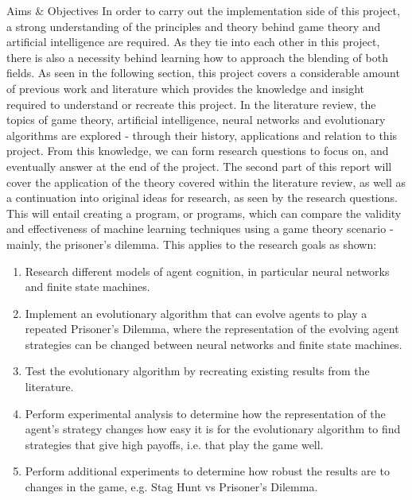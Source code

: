 \documentclass[12pt,a4paper]{article}
\makeatletter
\renewcommand\subsection{\@startsection {subsection}{1}{2mm}
                               {3pt plus 2pt minus 1pt}
                               {3pt plus 0pt}
                               {\normalfont\bfseries}}
\makeatother
\begin{document}
\subsection{Aims \& Objectives}
In order to carry out the implementation side of this project, a strong understanding of the principles and theory behind game theory and artificial intelligence are required. As they tie into each other in this project, there is also a necessity behind learning how to approach the blending of both fields. As seen in the following section, this project covers a considerable amount of previous work and literature which provides the knowledge and insight required to understand or recreate this project. In the literature review, the topics of game theory, artificial intelligence, neural networks and evolutionary algorithms are explored - through their history, applications and relation to this project. From this knowledge, we can form research questions to focus on, and eventually answer at the end of the project. The second part of this report will cover the application of the theory covered within the literature review, as well as a continuation into original ideas for research, as seen by the research questions. This will entail creating a program, or programs, which can compare the validity and effectiveness of machine learning techniques using a game theory scenario - mainly, the prisoner's dilemma. This applies to the research goals as shown: \\

\begin{enumerate}
  \item Research different models of agent cognition, in particular neural networks and finite state machines.
  \item Implement an evolutionary algorithm that can evolve agents to play a repeated Prisoner's Dilemma, where the representation of the evolving agent strategies can be changed between neural networks and finite state machines.
  \item Test the evolutionary algorithm by recreating existing results from the literature.
  \item Perform experimental analysis to determine how the representation of the agent's strategy changes how easy it is for the evolutionary algorithm to find strategies that give high payoffs, i.e. that play the game well.
  \item Perform additional experiments to determine how robust the results are to changes in the game, e.g. Stag Hunt vs Prisoner's Dilemma. \\
\end{enumerate}
\end{document}
